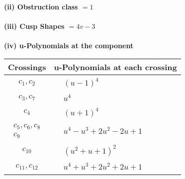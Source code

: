 \documentclass[1p]{elsarticle_modified}
\theoremstyle{definition}
\begin{document}
\flushleft \textbf{(ii) Obstruction class $= 1$}\\~\\
\flushleft \textbf{(iii) Cusp Shapes $= 4 v-3$}\\~\\
\newpage\renewcommand{\arraystretch}{1}
\flushleft \textbf{(iv) u-Polynomials at the component}\newline \\
\begin{tabular}{m{50pt}|m{274pt}}
Crossings & \hspace{64pt}u-Polynomials at each crossing \\
\hline $$\begin{aligned}c_{1},c_{2}\end{aligned}$$&$\begin{aligned}
&(u-1)^4
\end{aligned}$\\
\hline $$\begin{aligned}c_{3},c_{7}\end{aligned}$$&$\begin{aligned}
&u^4
\end{aligned}$\\
\hline $$\begin{aligned}c_{4}\end{aligned}$$&$\begin{aligned}
&(u+1)^4
\end{aligned}$\\
\hline $$\begin{aligned}c_{5},c_{6},c_{8}\\c_{9}\end{aligned}$$&$\begin{aligned}
&u^4- u^3+2 u^2-2 u+1
\end{aligned}$\\
\hline $$\begin{aligned}c_{10}\end{aligned}$$&$\begin{aligned}
&(u^2+u+1)^2
\end{aligned}$\\
\hline $$\begin{aligned}c_{11},c_{12}\end{aligned}$$&$\begin{aligned}
&u^4+u^3+2 u^2+2 u+1
\end{aligned}$\\
\hline
\end{tabular}\\~\\
\end{document}
